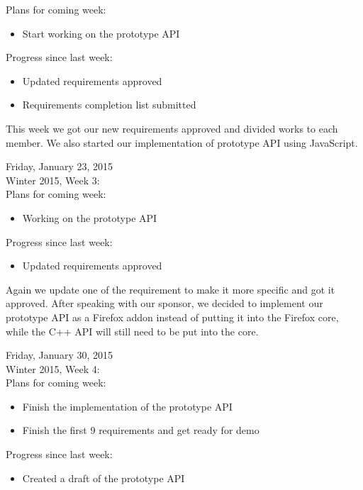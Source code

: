 Plans for coming week:
\begin{itemize}
\item Start working on ​​​​​the prototype API
\end{itemize}

Progress since last week:​
\begin{itemize}
\item Updated requirements approved​
\item Requirements completion list submitted
\end{itemize}

This week we got our new requirements approved and divided works to each member. ​We also started our implementation of prototype API using JavaScrip​t.

Friday, January 23, 2015 \\
Winter 2015, Week 3: \\

Plans for coming week:
\begin{itemize}
\item Working on ​​​​​the prototype API
\end{itemize}

Progress since last week:​
\begin{itemize}
\item Updated requirements approved
\end{itemize}


Again we update one of the requirement to make it more specific and got it approved. After speaking with our sponsor, we decided to implement our prototype API as a Firefox addon ​​​instead of putting it into the Firefox core, while the  C++ API will still need to be put into the core.

Friday, January 30, 2015 \\
​Winter 2015, Week 4: \\

Plans for coming week:
\begin{itemize}
\item Finish the implementation of the prototype API
\item Finish the first 9 requirements and get ready for demo
\end{itemize}

Progress since last week:​
\begin{itemize}
\item ​Created a draft of ​​the prototype API
​\end{itemize}

